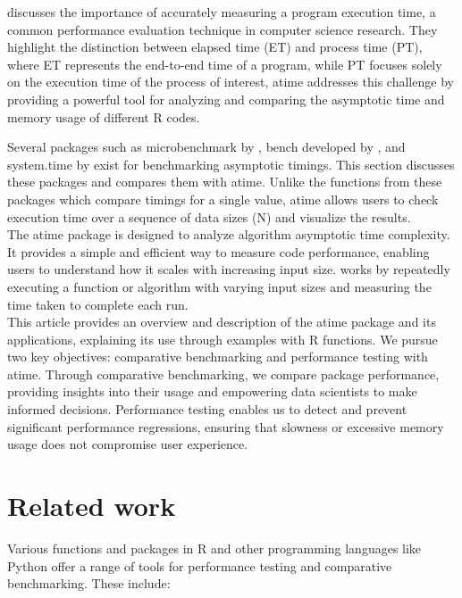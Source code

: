 \noindent \cite{suh2017emp} discusses the importance of accurately measuring a program execution time, a common performance evaluation technique in computer science research. They highlight the distinction between elapsed time (ET) and process time (PT), where ET represents the end-to-end time of a program, while PT focuses solely on the execution time of the process of interest, atime addresses this challenge by providing a powerful tool for analyzing and comparing the asymptotic time and memory usage of different R codes.

\noindent Several packages such as microbenchmark by \cite{microbenchmark}, bench developed by \cite{bench}, and system.time by \cite{system.time} exist for benchmarking asymptotic timings. This section discusses these packages and compares them with atime. Unlike the functions from these packages which compare timings for a single value, atime allows users to check execution time over a sequence of data sizes (N) and visualize the results.
\\ 
 
\noindent The atime package is designed to analyze algorithm asymptotic time complexity. It provides a simple and efficient way to measure code performance, enabling users to understand how it scales with increasing input size.  works by repeatedly executing a function or algorithm with varying input sizes and measuring the time taken to complete each run. \\

\noindent This article provides an overview and description of the atime package and its applications, explaining its use through examples with R functions. We pursue two key objectives: comparative benchmarking and performance testing with atime. Through comparative benchmarking, we compare package performance, providing insights into their usage and empowering data scientists to make informed decisions. Performance testing enables us to detect and prevent significant performance regressions, ensuring that slowness or excessive memory usage does not compromise user experience.\\

\section{Related work}

\noindent Various functions and packages in R and other programming languages like Python offer a range of tools for performance testing and comparative benchmarking. These include: 
\\

